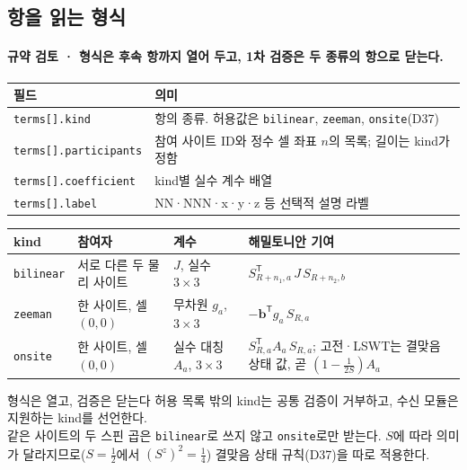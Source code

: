 \subsection{항을 읽는 형식}\label{term-schema}
\begingroup%
  \framesubtitle{규약 검토 · 형식은 후속 항까지 열어 두고, 1차 검증은 두 종류의 항으로 닫는다.}
  \small\renewcommand{\arraystretch}{1.12}
  \begin{tabularx}{\textwidth}{@{}p{4.1cm}Y@{}}
    \toprule
    필드 & 의미 \\
    \midrule
    \texttt{terms[].kind} & 항의 종류. 허용값은 \texttt{bilinear}, \texttt{zeeman}, \texttt{onsite}(D37) \\
    \texttt{terms[].participants} & 참여 사이트 ID와 정수 셀 좌표 $n$의 목록; 길이는 kind가 정함 \\
    \texttt{terms[].coefficient} & kind별 실수 계수 배열 \\
    \texttt{terms[].label} & NN·NNN·x·y·z 등 선택적 설명 라벨 \\
    \bottomrule
  \end{tabularx}
  \par\smallskip
  \begin{tabularx}{\textwidth}{@{}p{1.6cm}p{3.2cm}p{2.6cm}Y@{}}
    \toprule
    kind & 참여자 & 계수 & 해밀토니안 기여 \\
    \midrule
    \texttt{bilinear} & 서로 다른 두 물리 사이트 & $J$, 실수 $3\times3$ & $S_{R+n_1,a}^{\mathsf T}\,J\,S_{R+n_2,b}$ \\
    \texttt{zeeman} & 한 사이트, 셀 $(0,0)$ & 무차원 $g_a$, $3\times3$ & $-\mathbf b^{\mathsf T}g_a\,S_{R,a}$ \\
    \texttt{onsite} & 한 사이트, 셀 $(0,0)$ & 실수 대칭 $A_a$, $3\times3$ & $S_{R,a}^{\mathsf T}A_a\,S_{R,a}$; 고전·LSWT는 결맞음 상태 값, 곧 $(1-\tfrac1{2S})A_a$ \\
    \bottomrule
  \end{tabularx}
  \par\smallskip
  \begin{band}{형식은 열고, 검증은 닫는다}
    허용 목록 밖의 kind는 공통 검증이 거부하고, 수신 모듈은 지원하는 kind를 선언한다.\\
    같은 사이트의 두 스핀 곱은 \texttt{bilinear}로 쓰지 않고 \texttt{onsite}로만 받는다. $S$에 따라 의미가 달라지므로($S=\tfrac12$에서 $(S^z)^2=\tfrac14$) 결맞음 상태 규칙(D37)을 따로 적용한다.
  \end{band}
\endgroup


